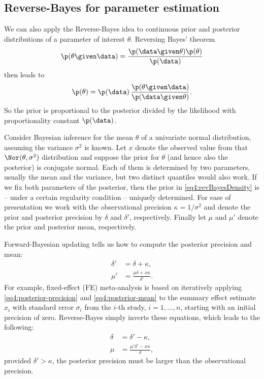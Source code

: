 \subsection{Reverse-Bayes for parameter estimation}
We can also apply the Reverse-Bayes idea to continuous prior and posterior
distributions of a parameter of interest $\theta$. Reversing Bayes' theorem
\begin{equation*}
  \p(\theta \given \data) = \frac{\p(\data \given \theta) \p(\theta)}{\p(\data)}
\end{equation*}
then leads to
\begin{equation}
  \p(\theta) = \p(\data) \, \frac{\p(\theta \given \data)}{\p(\data \given \theta)}.
\label{eq4:revBayesDensity}
\end{equation}
So the prior is proportional to the posterior divided by the likelihood with
proportionality constant $\p(\data)$.

Consider Bayesian inference for the mean $\theta$ of a univariate normal
distribution, assuming the variance $\sigma^2$ is known. Let $x$ denote the
observed value from that $\Nor(\theta, \sigma^2)$ distribution and suppose the
prior for $\theta$ (and hence also the posterior) is conjugate normal. Each of
them is determined by two parameters, usually the mean and the variance, but two
distinct quantiles would also work. If we fix both parameters of the posterior,
then the prior in \eqref{eq4:revBayesDensity} is -- under a certain regularity
condition -- uniquely determined. For ease of presentation we work with the
observational precision $\kappa=1/\sigma^2$ and denote the prior and posterior
precision by $\delta$ and $\delta'$, respectively. Finally let $\mu$ and $\mu'$
denote the prior and posterior mean, respectively.

Forward-Bayesian updating tells us how to compute the posterior precision and
mean:
\begin{align}
\label{eq4:posterior-precision}
\delta' &= \delta + \kappa, \\
\mu' &= \frac{\mu \delta + x \kappa}{\delta'}.\label{eq4:posterior-mean}
\end{align}
For example, fixed-effect (FE) meta-analysis is based on iteratively applying
\eqref{eq4:posterior-precision} and \eqref{eq4:posterior-mean} to the summary
effect estimate $x_i$ with standard error $\sigma_i$ from the $i$-th study,
$i=1,\ldots,n$, starting with an initial precision of zero. Reverse-Bayes simply
inverts these equations, which leads to the following:
\begin{align}
\label{eq4:prior-precision}
\delta &= \delta' - \kappa,  \\
\mu &= \frac{\mu'\delta' - x \kappa}{\delta}, \label{eq4:prior-mean}
\end{align}
provided $\delta' > \kappa$, \ie the posterior precision must be larger than the
observational precision.

